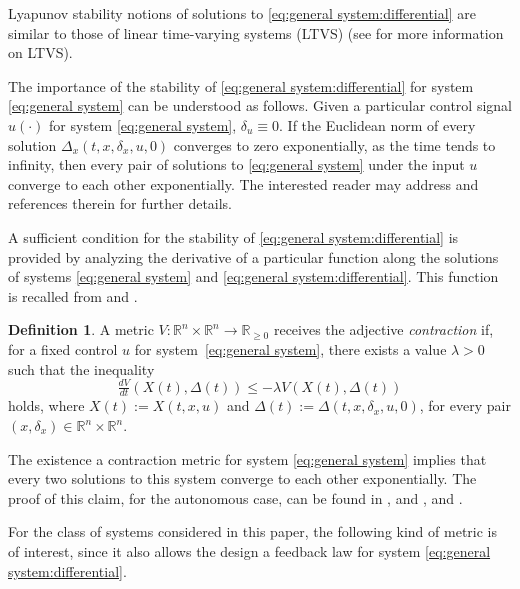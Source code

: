 \documentclass[10pt,twocolumn,twoside]{IEEEtran}
\newcounter{para}
\newcommand\mypara{\par}
\theoremstyle{plain}
\theoremstyle{definition}
\newtheorem{definition}{Definition}
\theoremstyle{remark}
\begin{document}
\mypara Lyapunov stability notions of solutions to \eqref{eq:general system:differential} are similar to those of linear time-varying systems (LTVS) (see \cite{Hespanha:2009} for more information on LTVS). 

\mypara The importance of the stability of \eqref{eq:general system:differential} for system \eqref{eq:general system} can be understood as follows. Given a particular control signal $u(\cdot)$ for system \eqref{eq:general system}, $\delta_u\equiv0$. If the Euclidean norm of every solution $\Delta_x(t,x,\delta_x,u,0)$ converges to zero exponentially, as the time tends to infinity, then every pair of solutions to \eqref{eq:general system} under the input $u$ converge to each other exponentially. The interested reader may address \cite{Lohmiller1998,Sontag2010} and references therein for further details.

\mypara A sufficient condition for the stability of \eqref{eq:general system:differential} is provided by analyzing the derivative of a particular function along the solutions of systems \eqref{eq:general system} and \eqref{eq:general system:differential}. This function is recalled from \cite{Forni2014} and \cite{Manchester2014a}.

\begin{definition}\label{def:}
		 A metric $V:\mathbb{R}^n\times\mathbb{R}^n\to\mathbb{R}_{\geq0}$ receives the adjective \emph{contraction} if, for a fixed control $u$ for system~\eqref{eq:general system}, there exists a value $\lambda>0$ such that the inequality
	 	 \begin{equation}
	 	 	\tfrac{dV}{dt}(X(t),\Delta(t))\leq -\lambda V(X(t),\Delta(t))
 	 	 \end{equation}
 	 	 holds, where $X(t):=X(t,x,u)$ and $\Delta(t):=\Delta(t,x,\delta_x,u,0)$, for every pair $(x,\delta_x)\in\mathbb{R}^n\times\mathbb{R}^n$.
\end{definition}


\mypara The existence a contraction metric for system \eqref{eq:general system} implies that every two solutions to this system converge to each other exponentially. The proof of this claim, for the autonomous case, can be found in \cite[Theorem 1]{Lewis1951}, and \cite[Theorems 5.7 and 5.33]{Reich2005}, and \cite[Lemma 3.3]{Isac2008}.

\mypara For the class of systems considered in this paper, the following kind of metric is of interest, since it also allows the design a feedback law for system \eqref{eq:general system:differential}.
\end{document}
